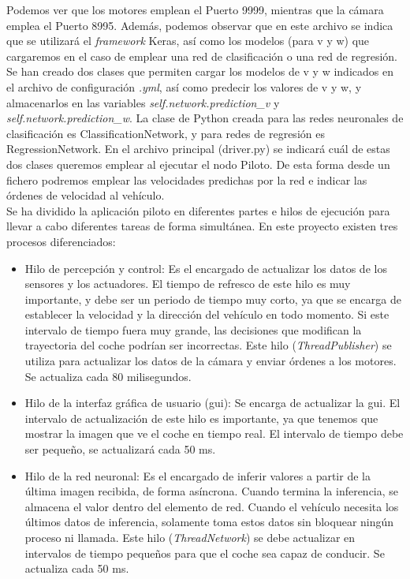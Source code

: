 Podemos ver que los motores emplean el Puerto 9999, mientras que la cámara emplea el Puerto 8995. Además, podemos observar que en este archivo se indica que se utilizará el \textit{framework} Keras, así como los modelos (para v y w) que cargaremos en el caso de emplear una red de clasificación o una red de regresión.\\

Se han creado dos clases que permiten cargar los modelos de v y w indicados en el archivo de configuración \textit{.yml}, así como predecir los valores de v y w, y almacenarlos en las variables \textit{self.network.prediction\_v} y \textit{self.network.prediction\_w}. La clase de Python creada para las redes neuronales de clasificación es ClassificationNetwork, y para redes de regresión es RegressionNetwork. En el archivo principal (driver.py) se indicará cuál de estas dos clases queremos emplear al ejecutar el nodo Piloto. De esta forma desde un fichero podremos emplear las velocidades predichas por la red e indicar las órdenes de velocidad al vehículo.\\

Se ha dividido la aplicación piloto en diferentes partes e hilos de ejecución para llevar a cabo diferentes tareas de forma simultánea. En este proyecto existen tres procesos diferenciados:

\begin{itemize}
    \item Hilo de percepción y control: Es el encargado de actualizar los datos de los sensores y los actuadores. El tiempo de refresco de este hilo es muy importante, y debe ser un periodo de tiempo muy corto, ya que se encarga de establecer la velocidad y la dirección del vehículo en todo momento. Si este intervalo de tiempo fuera muy grande, las decisiones que modifican la trayectoria del coche podrían ser incorrectas. Este hilo (\textit{ThreadPublisher}) se utiliza para actualizar los datos de la cámara y enviar órdenes a los motores. Se actualiza cada 80 milisegundos.
    
    \item Hilo de la interfaz gráfica de usuario (\acrshort{gui}): Se encarga de actualizar la \acrshort{gui}. El intervalo de actualización de este hilo es importante, ya que tenemos que mostrar la imagen que ve el coche en tiempo real. El intervalo de tiempo debe ser pequeño, se actualizará cada 50 ms.
    
    \item Hilo de la red neuronal: Es el encargado de inferir valores a partir de la última imagen recibida, de forma asíncrona. Cuando termina la inferencia, se almacena el valor dentro del elemento de red. Cuando el vehículo necesita los últimos datos de inferencia, solamente toma estos datos sin bloquear ningún proceso ni llamada. Este hilo (\textit{ThreadNetwork}) se debe actualizar en intervalos de tiempo pequeños para que el coche sea capaz de conducir. Se actualiza cada 50 ms.

\end{itemize}

